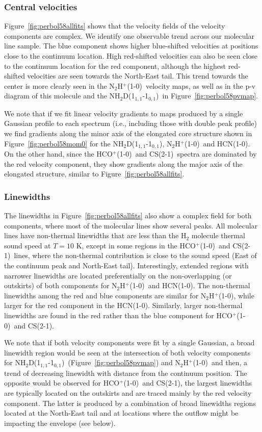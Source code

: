 \documentclass[iop]{emulateapj}
\newcommand{\nhtd}{\mbox{\rm NH$_2$D(1$_{1,1}$-1$_{0,1}$)}}
\newcommand{\nthp}{\mbox{\rm N$_2$H$^+$(1-0)}}
\newcommand{\hcn}{\mbox{\rm HCN(1-0)}}
\newcommand{\hcop}{\mbox{\rm  HCO$^+$(1-0)}}
\newcommand{\cs}{\mbox{\rm CS(2-1)}}
\begin{document}
\subsubsection{Central velocities}


Figure~\ref{fig:perbol58allfits} shows that the velocity fields of the velocity components are complex. We identify one observable trend across our molecular line sample. The blue component shows higher blue-shifted velocities at positions close to the continuum location. High red-shifted velocities can also be seen close to the continuum location for the red component, although the highest red-shifted velocities are seen towards the North-East tail. This trend towards the center is more clearly seen in the \nthp\ velocity maps, as well as in the p-v diagram of this molecule and the \nhtd\ in Figure~\ref{fig:perbol58pvmap}.

We note that if we fit linear velocity gradients to maps produced by a single Gaussian profile to each spectrum (i.e., including those with double peak profile) we find gradients along the minor axis of the elongated core structure shown in Figure~\ref{fig:perbol58mom0} for the \nhtd, \nthp\ and \hcn. On the other hand, since the \hcop\ and \cs\ spectra are dominated by the red velocity component, they show gradients along the major axis of the elongated structure, similar to Figure~\ref{fig:perbol58allfits}.


\subsubsection{Linewidths}

The linewidths in Figure~\ref{fig:perbol58allfits} also show a complex field for both components, where most of the molecular lines show several peaks. All molecular lines have non-thermal linewidths that are less than the H$_2$ molecule thermal sound speed at $T=10$ K, except in some regions in the \hcop\ and \cs\ lines, where the non-thermal contribution is close to the sound speed (East of the continuum peak and North-East tail). Interestingly, extended regions with narrower linewidths are located preferentially on the non-overlapping (or outskirts) of both components for \nthp\ and \hcn. The non-thermal linewidths among the red and blue components are similar for \nthp, while larger for the red component in the \hcn. Similarly, larger non-thermal linewidths are found in the red rather than the blue component for \hcop\ and \cs.

We note that if both velocity components were fit by a single Gaussian, a broad linewidth region would be seen at the intersection of both velocity components for \nhtd\ (Figure~\ref{fig:perbol58pvmap}) and \nthp\ and then, a trend of decreasing linewidth with distance from the continuum position. The opposite would be observed for \hcop\ and \cs, the largest linewidths are typically located on the outskirts and are traced mainly by the red velocity component. The latter is produced by a combination of broad linewidths regions located at the North-East tail and at locations where the outflow might be impacting the envelope (see below).
\end{document}
